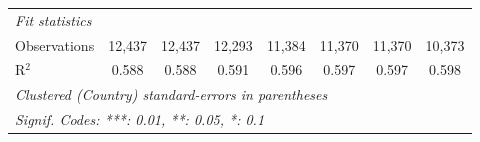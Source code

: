 \begin{tabular}{lccccccc}
   \midrule \emph{Fit statistics}\\
   Observations                                                                        & 12,437  & 12,437       & 12,293        & 11,384        & 11,370        & 11,370        & 10,373\\  
   R$^2$                                                                               & 0.588   & 0.588        & 0.591         & 0.596         & 0.597         & 0.597         & 0.598\\  
   \midrule
   \multicolumn{8}{l}{\emph{Clustered (Country) standard-errors in parentheses}}\\
   \multicolumn{8}{l}{\emph{Signif. Codes: ***: 0.01, **: 0.05, *: 0.1}}\\
\end{tabular}
\par\endgroup


